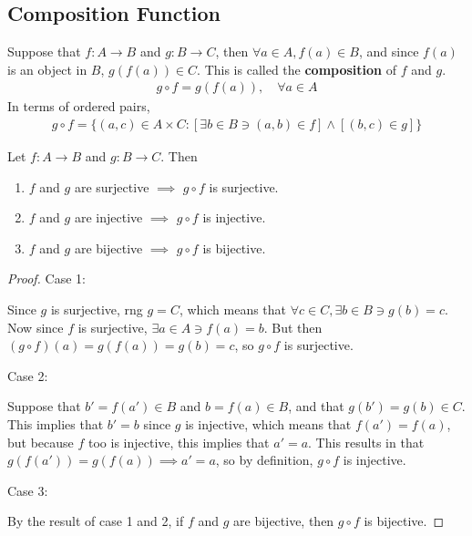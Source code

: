 \newpage
\subsection{Composition Function}
\begin{definition}
	Suppose that $f:A\rightarrow B$ and $g:B\rightarrow C$, then $\forall a\in A, f(a)\in B$, and since $f(a)$ is an object in $B$, $g(f(a))\in C$. This is called the \textbf{composition} of $f$ and $g$.
	\begin{align*}
		g \circ f = g(f(a)), \quad \forall a\in A
	\end{align*}
	In terms of ordered pairs,
	\begin{align*}
		g \circ f = \{(a,c)\in A\times C:[\exists b\in B\ni (a,b)\in f]\land [(b,c)\in g]\}
	\end{align*}
\end{definition}

\begin{theorem}
	\label{theolabel2}
	Let $f:A\rightarrow B$ and $g:B\rightarrow C$. Then
	\begin{enumerate}
		\item $f$ and $g$ are surjective $\implies$ $g \circ f$ is surjective.
		\item $f$ and $g$ are injective $\implies$ $g \circ f$ is injective.
		\item $f$ and $g$ are bijective $\implies$ $g \circ f$ is bijective.
	\end{enumerate}
\end{theorem}

\begin{proof}
	Case 1:
	
	Since $g$ is surjective, rng $g=C$, which means that $\forall c\in C, \exists b\in B \ni g(b)=c$. Now since $f$ is surjective, $\exists a\in A \ni f(a)=b$. But then $(g\circ f)(a)=g(f(a))=g(b)=c$, so $g\circ f$ is surjective. \bigskip
	
	Case 2:
	
	Suppose that $b'=f(a')\in B$ and $b=f(a)\in B$, and that $g(b')=g(b)\in C$. This implies that $b'=b$ since $g$ is injective, which means that $f(a')=f(a)$, but because $f$ too is injective, this implies that $a'=a$. This results in that $g(f(a'))=g(f(a)) \implies a'=a$, so by definition, $g\circ f$ is injective.
	
	Case 3: 
	
	By the result of case 1 and 2, if $f$ and $g$ are bijective, then $g \circ f$ is bijective.
\end{proof}


